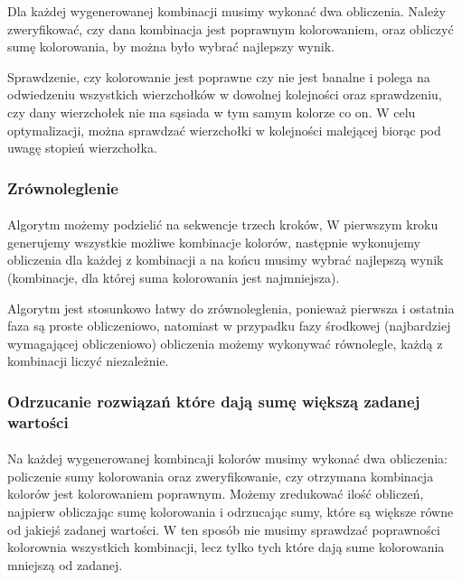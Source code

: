 \documentclass{article}
\begin{document}
Dla każdej wygenerowanej kombinacji musimy wykonać dwa obliczenia. Należy zweryfikować, czy dana kombinacja jest poprawnym kolorowaniem, oraz obliczyć sumę kolorowania, by można było wybrać najlepszy wynik.

Sprawdzenie, czy kolorowanie jest poprawne czy nie jest banalne i polega na odwiedzeniu wszystkich wierzchołków w dowolnej kolejności oraz sprawdzeniu, czy dany wierzchołek nie ma sąsiada w tym samym kolorze co on. W celu optymalizacji, można sprawdzać wierzchołki w kolejności malejącej biorąc pod uwagę stopień wierzchołka.

\subsubsection*{Zrównoleglenie}

\paragraph{} Algorytm możemy podzielić na sekwencje trzech kroków, W pierwszym kroku generujemy wszystkie możliwe kombinacje kolorów, następnie wykonujemy obliczenia dla każdej z kombinacji a na końcu musimy wybrać najlepszą wynik (kombinacje, dla której suma kolorowania jest najmniejsza).

Algorytm jest stosunkowo łatwy do zrównoleglenia, ponieważ pierwsza i ostatnia faza są proste obliczeniowo, natomiast w przypadku fazy środkowej (najbardziej wymagającej obliczeniowo) obliczenia możemy wykonywać równolegle, każdą z kombinacji liczyć niezależnie.

\subsubsection*{Odrzucanie rozwiązań które dają sumę większą zadanej wartości}

\paragraph{} Na każdej wygenerowanej kombincaji kolorów musimy wykonać dwa obliczenia: policzenie sumy kolorowania oraz zweryfikowanie, czy otrzymana kombinacja kolorów jest kolorowaniem poprawnym. Możemy zredukować ilość obliczeń, najpierw obliczając sumę kolorowania i odrzucając sumy, które są większe równe od jakiejś zadanej wartości. W ten sposób nie musimy sprawdzać poprawności kolorownia wszystkich kombinacji, lecz tylko tych które dają sume kolorowania mniejszą od zadanej.
\end{document}
